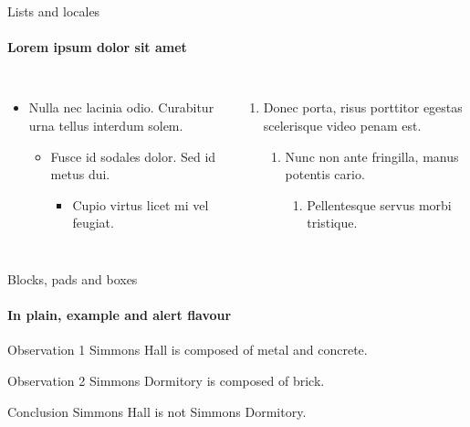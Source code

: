 \documentclass{beamer}
\begin{document}
  \begin{frame}[label=lists]{Lists and locales}
    \framesubtitle{Lorem ipsum dolor sit amet}
    \begin{columns}[onlytextwidth]
        \begin{itemize}
          \item Nulla nec lacinia odio. Curabitur urna tellus interdum solem.
          \begin{itemize}
            \item Fusce id sodales dolor. Sed id metus dui.
            \begin{itemize}
              \item Cupio virtus licet mi vel feugiat.
            \end{itemize}
          \end{itemize}
        \end{itemize}
        \begin{enumerate}
          \item Donec porta, risus porttitor egestas scelerisque video penam est.
          \begin{enumerate}
            \item Nunc non ante fringilla, manus potentis cario.
            \begin{enumerate}
              \item Pellentesque servus morbi tristique.
            \end{enumerate}
          \end{enumerate}
        \end{enumerate}
    \end{columns}
  \end{frame}

  \begin{frame}[label=simmonshall]{Blocks, pads and boxes}
    \framesubtitle{In plain, example and alert flavour}
    \begin{block}{Observation 1}
      Simmons Hall is composed of metal and concrete.
    \end{block}
    \begin{exampleblock}{Observation 2}
      Simmons Dormitory is composed of brick.
    \end{exampleblock}
    \begin{alertblock}{Conclusion}
      Simmons Hall is not Simmons Dormitory.
    \end{alertblock}
  \end{frame}
\end{document}
